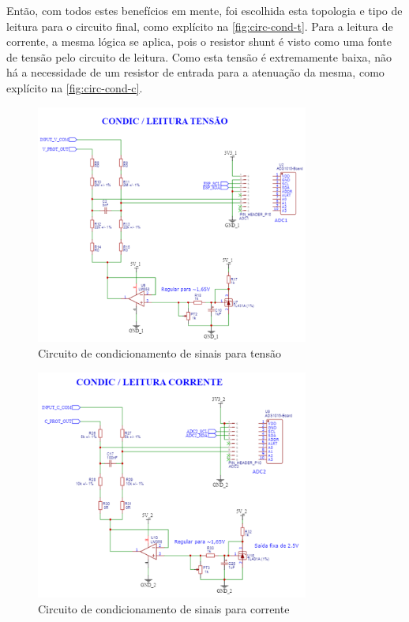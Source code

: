 Então, com todos estes benefícios em mente, foi escolhida esta topologia e tipo de leitura para o circuito final, como explícito na \autoref{fig:circ-cond-t}. Para a leitura de corrente, a mesma lógica se aplica, pois o resistor shunt é visto como uma fonte de tensão pelo circuito de leitura. Como esta tensão é extremamente baixa, não há a necessidade de um resistor de entrada para a atenuação da mesma, como explícito na \autoref{fig:circ-cond-c}.

\begin{figure}[htb!]
    \caption{Circuito de condicionamento de sinais para tensão}
    \label{fig:circ-cond-t}
    \includegraphics[width=0.8\textwidth]{figuras/circ-cond-t.png}
    \fonte{}
\end{figure}

\begin{figure}[htb!]
    \caption{Circuito de condicionamento de sinais para corrente}
    \label{fig:circ-cond-c}
    \includegraphics[width=0.8\textwidth]{figuras/circ-cond-c.png}
    \fonte{}
\end{figure}

